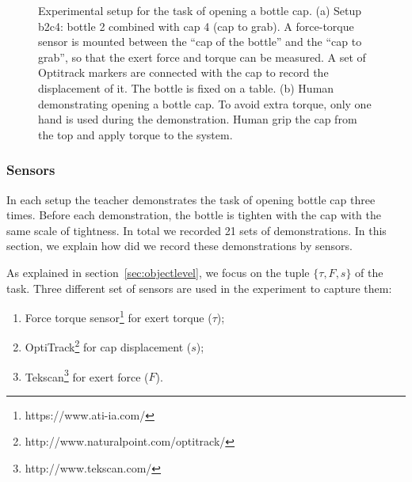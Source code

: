 \begin{figure}
  \centering
  \hspace{1cm}
  \caption{ \scriptsize{Experimental setup for the task of opening a bottle cap. (a) Setup b2c4: bottle 2 combined with cap 4 (cap to grab). A force-torque sensor is mounted between the ``cap of the bottle'' and the ``cap to grab'', so that the exert force and torque can be measured. A set of Optitrack markers are connected with the cap to record the displacement of it. The bottle is fixed on a table. (b) Human demonstrating opening a bottle cap. To avoid extra torque, only one hand is used during the demonstration. Human grip the cap from the top and apply torque to the system. }
}
\label{fig:setup}
\end{figure}

\subsubsection{Sensors}
\label{sec:sensor}
In each setup the teacher demonstrates the task of opening bottle cap three times. Before each demonstration, the bottle is tighten with the cap with the same scale of tightness. In total we recorded 21 sets of demonstrations. In this section, we explain how did we record these demonstrations by sensors.



As explained in section~\ref{sec:objectlevel}, we focus on the tuple $\{\tau,F,s\}$ of the task. Three different set of sensors are used in the experiment to capture them:

\begin{enumerate}
\item Force torque sensor\footnote{https://www.ati-ia.com/} for exert torque ($\tau$);
\item OptiTrack\footnote{http://www.naturalpoint.com/optitrack/} for cap displacement ($s$);
\item Tekscan\footnote{http://www.tekscan.com/} for exert force ($F$).
\end{enumerate}

